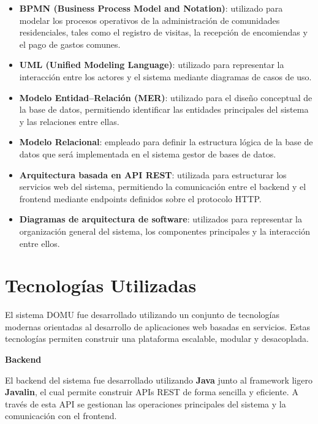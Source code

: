 \begin{itemize}

\item \textbf{BPMN (Business Process Model and Notation)}: utilizado para modelar los procesos operativos de la administración de comunidades residenciales, tales como el registro de visitas, la recepción de encomiendas y el pago de gastos comunes.

\item \textbf{UML (Unified Modeling Language)}: utilizado para representar la interacción entre los actores y el sistema mediante diagramas de casos de uso.

\item \textbf{Modelo Entidad--Relación (MER)}: utilizado para el diseño conceptual de la base de datos, permitiendo identificar las entidades principales del sistema y las relaciones entre ellas.

\item \textbf{Modelo Relacional}: empleado para definir la estructura lógica de la base de datos que será implementada en el sistema gestor de bases de datos.

\item \textbf{Arquitectura basada en API REST}: utilizada para estructurar los servicios web del sistema, permitiendo la comunicación entre el backend y el frontend mediante endpoints definidos sobre el protocolo HTTP.

\item \textbf{Diagramas de arquitectura de software}: utilizados para representar la organización general del sistema, los componentes principales y la interacción entre ellos.

\end{itemize}

\section{Tecnologías Utilizadas}

El sistema DOMU fue desarrollado utilizando un conjunto de tecnologías modernas orientadas al desarrollo de aplicaciones web basadas en servicios. Estas tecnologías permiten construir una plataforma escalable, modular y desacoplada.

\textbf{Backend}

El backend del sistema fue desarrollado utilizando \textbf{Java} junto al framework ligero \textbf{Javalin}, el cual permite construir APIs REST de forma sencilla y eficiente. A través de esta API se gestionan las operaciones principales del sistema y la comunicación con el frontend.

